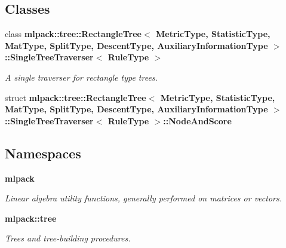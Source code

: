 \subsection*{Classes}
\begin{DoxyCompactItemize}
\item 
class {\bf mlpack\+::tree\+::\+Rectangle\+Tree$<$ Metric\+Type, Statistic\+Type, Mat\+Type, Split\+Type, Descent\+Type, Auxiliary\+Information\+Type $>$\+::\+Single\+Tree\+Traverser$<$ Rule\+Type $>$}
\begin{DoxyCompactList}\small\item\em A single traverser for rectangle type trees. \end{DoxyCompactList}\item 
struct {\bf mlpack\+::tree\+::\+Rectangle\+Tree$<$ Metric\+Type, Statistic\+Type, Mat\+Type, Split\+Type, Descent\+Type, Auxiliary\+Information\+Type $>$\+::\+Single\+Tree\+Traverser$<$ Rule\+Type $>$\+::\+Node\+And\+Score}
\end{DoxyCompactItemize}
\subsection*{Namespaces}
\begin{DoxyCompactItemize}
\item 
 {\bf mlpack}
\begin{DoxyCompactList}\small\item\em Linear algebra utility functions, generally performed on matrices or vectors. \end{DoxyCompactList}\item 
 {\bf mlpack\+::tree}
\begin{DoxyCompactList}\small\item\em Trees and tree-\/building procedures. \end{DoxyCompactList}\end{DoxyCompactItemize}
